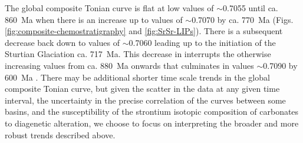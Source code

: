 The global composite Tonian \SrSr curve is flat at low values of $\sim$0.7055 until ca. 860~Ma when there is an increase up to \SrSr values of $\sim$0.7070 by ca. 770~Ma (Figs. \ref{fig:composite-chemostratigraphy} and \ref{fig:SrSr-LIPs}). There is a subsequent decrease back down to values of $\sim$0.7060 leading up to the initiation of the Sturtian Glaciation ca. 717~Ma. This decrease in \SrSr interrupts the otherwise increasing \SrSr values from ca. 880~Ma onwards that culminates in values $\sim$0.7090 by 600~Ma \citep{Halverson2007a}. There may be additional shorter time scale trends in the global composite Tonian \SrSr curve, but given the scatter in the data at any given time interval, the uncertainty in the precise correlation of the curves between some basins, and the susceptibility of the strontium isotopic composition of carbonates to diagenetic alteration, we choose to focus on interpreting the broader and more robust trends described above.

